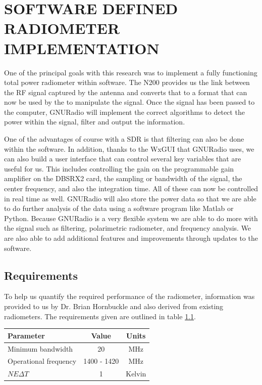\chapter{SOFTWARE DEFINED RADIOMETER IMPLEMENTATION}\label{ch:implementation}

One of the principal goals with this research was to implement a fully functioning total power radiometer within software.  The N200 provides us the link between the RF signal captured by the antenna and converts that to a format that can now be used by the to manipulate the signal.  Once the signal has been passed to the computer, GNURadio will implement the correct algorithms to detect the power within the signal, filter and output the information.  

One of the advantages of course with a SDR is that filtering can also be done within the software.  In addition, thanks to the WxGUI that GNURadio uses, we can also build a user interface that can control several key variables that are useful for us.  This includes controlling the gain on the programmable gain amplifier on the DBSRX2 card, the sampling or bandwidth of the signal, the center frequency, and also the integration time.  All of these can now be controlled in real time as well.  GNURadio will also store the power data so that we are able to do further analysis of the data using a software program like Matlab or Python.  Because GNURadio is a very flexible system we are able to do more with the signal such as filtering, polarimetric  radiometer, and frequency analysis.  We are also able to add additional features and improvements through updates to the software.

\section{Requirements}\label{requirements}

To help us quantify the required performance of the radiometer, information was provided to us by Dr. Brian Hornbuckle and also derived from existing radiometers.  The requirements given are outlined in table \ref{rad_performance}.

\begin{table}[h!tb] \centering
{}
\label{rad_performance}
\begin{tabular}{lcc} \hline
\textbf{Parameter} & \textbf{Value} & \textbf{Units} \\ \hline
Minimum bandwidth & 20 & MHz \\
Operational frequency & 1400 - 1420 & MHz \\
$NE\Delta T$ & 1 & Kelvin \\ \hline
\end{tabular}
\end{table}

